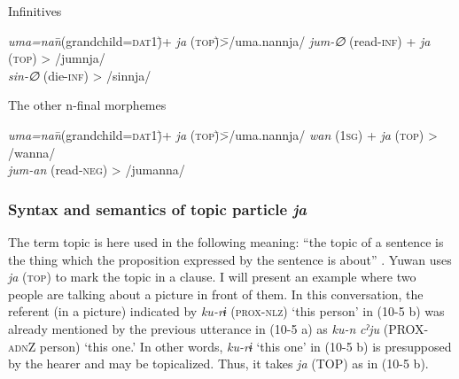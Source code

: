   \ex Infinitives
    \begin{tabbing}
    \textit{uma=nan}\hspace{\tabcolsep}\=\hspace{\tabcolsep}(grandchild=\textsc{dat}1)\hspace{\tabcolsep}\=\hspace{\tabcolsep}+  \textit{ja} (\textsc{top})\hspace{\tabcolsep}\=\hspace{\tabcolsep}>\hspace{\tabcolsep}\=\hspace{\tabcolsep}/uma.nannja/\kill
    \textit{jum-∅} \> (read-\textsc{inf}) \>  +  \textit{ja} (\textsc{top}) \> > \> /jumnja/\\
    \textit{sin-∅} \> (die-\textsc{inf})  \>                       \> > \> /sinnja/\\
    \end{tabbing}

  \ex The other n-final morphemes
    \begin{tabbing}
    \textit{uma=nan}\hspace{\tabcolsep}\=\hspace{\tabcolsep}(grandchild=\textsc{dat}1)\hspace{\tabcolsep}\=\hspace{\tabcolsep}+  \textit{ja} (\textsc{top})\hspace{\tabcolsep}\=\hspace{\tabcolsep}>\hspace{\tabcolsep}\=\hspace{\tabcolsep}/uma.nannja/\kill
    \textit{wan}    \> (1\textsc{sg})      \>    +  \textit{ja} (\textsc{top}) \> > \> /wanna/  \\
    \textit{jum-an} \> (read-\textsc{neg}) \>                         \> > \> /jumanna/\\
    \end{tabbing}
\z
\z

\subsubsection{Syntax and semantics of topic particle \textit{ja}}\label{sec:10.1.1.2}

The term topic is here used in the following meaning: “the topic of a sentence is the thing which the proposition expressed by the sentence is about” \citep[118]{Lambrecht1994}. Yuwan uses \textit{ja} (\textsc{top}) to mark the topic in a clause. I will present an example where two people are talking about a picture in front of them. In this conversation, the referent (in a picture) indicated by \textit{ku-rɨ} (\textsc{prox}-\textsc{nlz}) ‘this person’ in (10-5 b) was already mentioned by the previous utterance in (10-5 a) as \textit{ku-n} \textit{cˀju} (PROX-\textsc{adn}Z person) ‘this one.’ In other words, \textit{ku-rɨ} ‘this one’ in (10-5 b) is presupposed by the hearer and may be topicalized. Thus, it takes \textit{ja} (TOP) as in (10-5 b).

